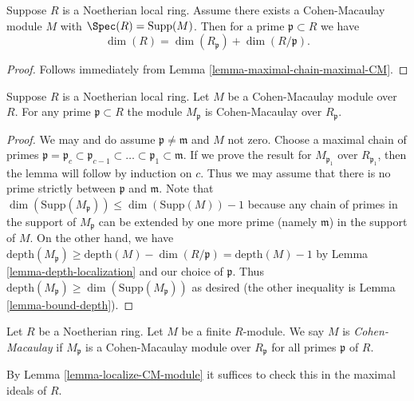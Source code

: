 \begin{lemma}
\label{lemma-dim-formula-maximal-CM}
Suppose $R$ is a Noetherian local ring. Assume there exists a
Cohen-Macaulay module $M$ with $\Spec(R) = \text{Supp}(M)$. Then for
a prime $\mathfrak p \subset R$ we have
$$
\dim(R) = \dim(R_{\mathfrak p}) + \dim(R/\mathfrak p).
$$
\end{lemma}

\begin{proof}
Follows immediately from Lemma \ref{lemma-maximal-chain-maximal-CM}.
\end{proof}

\begin{lemma}
\label{lemma-localize-CM-module}
Suppose $R$ is a Noetherian local ring. Let $M$ be a Cohen-Macaulay
module over $R$. For any prime $\mathfrak p \subset R$ the
module $M_{\mathfrak p}$ is Cohen-Macaulay over $R_\mathfrak p$.
\end{lemma}

\begin{proof}
We may and do assume $\mathfrak p \not = \mathfrak m$ and $M$ not zero.
Choose a maximal chain of primes $\mathfrak p = \mathfrak p_c \subset
\mathfrak p_{c - 1} \subset \ldots \subset \mathfrak p_1 \subset \mathfrak m$.
If we prove the result for $M_{\mathfrak p_1}$ over $R_{\mathfrak p_1}$,
then the lemma will follow by induction on $c$. Thus we may assume that
there is no prime strictly between $\mathfrak p$ and $\mathfrak m$.
Note that
$\dim(\text{Supp}(M_\mathfrak p)) \leq \dim(\text{Supp}(M)) - 1$
because any chain of primes in the support of $M_\mathfrak p$
can be extended by one more prime (namely $\mathfrak m$) in the
support of $M$. On the other hand, we have
$\text{depth}(M_\mathfrak p) \geq \text{depth}(M) - \dim(R/\mathfrak p) =
\text{depth}(M) - 1$ by Lemma \ref{lemma-depth-localization} and our
choice of $\mathfrak p$.
Thus $\text{depth}(M_\mathfrak p) \geq \dim(\text{Supp}(M_\mathfrak p))$
as desired (the other inequality is Lemma \ref{lemma-bound-depth}).
\end{proof}

\begin{definition}
\label{definition-module-CM}
Let $R$ be a Noetherian ring. Let $M$ be a finite $R$-module.
We say $M$ is {\it Cohen-Macaulay} if $M_\mathfrak p$ is a Cohen-Macaulay
module over $R_\mathfrak p$ for all primes $\mathfrak p$ of $R$.
\end{definition}

\noindent
By Lemma \ref{lemma-localize-CM-module} it suffices to check this
in the maximal ideals of $R$.

